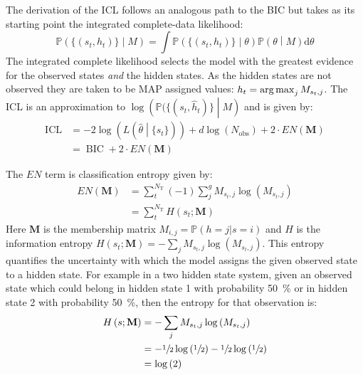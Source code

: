 The derivation of the ICL follows an analogous path to the BIC but takes as its starting point the integrated complete-data likelihood: 
\begin{equation}\label{eqn:class_lik_int}
    \mathbb{P}\left(\{(s_t, h_t)\}\middle | M \right) = \int \mathbb{P}\left(\{(s_{t}, h_{t})\}\middle |\theta \right)\mathbb{P}\left(\theta\middle | M\right) \mathrm{d}\theta
\end{equation}
The integrated complete likelihood selects the model with the greatest evidence for the observed states \emph{and} the hidden states. As the hidden states are not observed they are taken to be MAP assigned values: $h_t = \operatorname*{arg\,max}_{j} M_{s_{t}, j}$. The ICL is an approximation to $\log{\left(\mathbb{P}(\{(s_t, \hat{h}_t)\}\middle | M \right)}$ and is given by\cite{biernackiAssessingMixtureModel2000a}:
\begin{equation}\label{eqn:icl}
\begin{split}
        \operatorname{ICL} &= -2\log{\left(L\left(\hat{\theta}\middle|\{s_t\}\right)\right)} + d\log{\left(N_{\mathrm{obs}}\right)} +2\cdot EN\left(\mathbf{M}\right)     \\
        & = \operatorname{BIC} + 2\cdot EN\left(\mathbf{M}\right)
\end{split}
\end{equation}

The $EN$ term  is classification entropy given by\cite{biernackiAssessingMixtureModel2000a}:
\begin{equation}\label{eqn:class_entropy}
\begin{split}
     EN\left(\mathbf{M}\right) & = \sum_{t}^{N_{\mathrm{T}}}(-1)\sum_{j}^{g} M_{s_{t}, j}\log{\left(M_{s_{t}, j}\right)}  \\ 
     & =\sum_{t}^{N_{\mathrm{T}}} H\left(s_{t}; \mathbf{M}\right)
\end{split}
\end{equation}
Here $\mathbf{M}$ is the membership matrix $M_{i,j}= \mathbb{P}(h=j|s=i)$ and $H$ is the information entropy $H\left(s_{t};\mathbf{M}\right) = -\sum_{j} M_{s_{t}, j}\log{\left(M_{s_t, j}\right)}$. This entropy quantifies the uncertainty with which the model assigns the given observed state to a hidden state. For example in a two hidden state system, given an observed state which could belong in hidden state 1 with probability \SI{50}{\percent} or in hidden state 2 with probability \SI{50}{\percent}, then the entropy for that observation is:
\begin{equation}
\begin{split}
    H\left(s; \mathbf{M}\right) & =  -\sum_{j} M_{s_{t}, j}\log{\left(M_{s_t, j}\right)} \\
    & = -\sfrac{1}{2}\log{\left(\sfrac{1}{2}\right)} - \sfrac{1}{2}\log{\left(\sfrac{1}{2}\right)} \\
    & = \log{\left(2\right)}
\end{split}
\end{equation}
 
